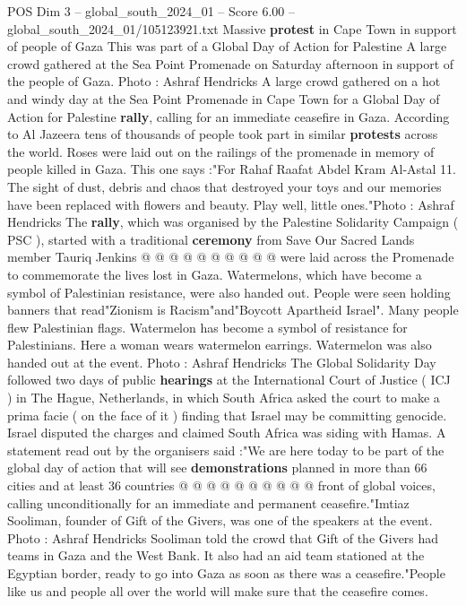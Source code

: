 \begin{textsample}{POS Dim 3 – global\_south\_2024\_01 – Score 6.00 – global\_south\_2024\_01/105123921.txt}  \label{ex:f3_pos_382}
Massive \textbf{protest} in Cape Town in support of people of Gaza This was part of a Global Day of Action for Palestine A large crowd gathered at the Sea Point Promenade on Saturday afternoon in support of the people of Gaza.
Photo : Ashraf Hendricks A large crowd gathered on a hot and windy day at the Sea Point Promenade in Cape Town for a Global Day of Action for Palestine \textbf{rally}, calling for an immediate ceasefire in Gaza.
According to Al Jazeera tens of thousands of people took part in similar \textbf{protests} across the world.
Roses were laid out on the railings of the promenade in memory of people killed in Gaza.
This one says :"For Rahaf Raafat Abdel Kram Al-Astal 11.
The sight of dust, debris and chaos that destroyed your toys and our memories have been replaced with flowers and beauty.
Play well, little ones."Photo : Ashraf Hendricks The \textbf{rally}, which was organised by the Palestine Solidarity Campaign ( PSC ), started with a traditional \textbf{ceremony} from Save Our Sacred Lands member Tauriq Jenkins @ @ @ @ @ @ @ @ @ @ were laid across the Promenade to commemorate the lives lost in Gaza.
Watermelons, which have become a symbol of Palestinian resistance, were also handed out.
People were seen holding banners that read"Zionism is Racism"and"Boycott Apartheid Israel".
Many people flew Palestinian flags.
Watermelon has become a symbol of resistance for Palestinians.
Here a woman wears watermelon earrings.
Watermelon was also handed out at the event.
Photo : Ashraf Hendricks The Global Solidarity Day followed two days of public \textbf{hearings} at the International Court of Justice ( ICJ ) in The Hague, Netherlands, in which South Africa asked the court to make a prima facie ( on the face of it ) finding that Israel may be committing genocide.
Israel disputed the charges and claimed South Africa was siding with Hamas.
A statement read out by the organisers said :"We are here today to be part of the global day of action that will see \textbf{demonstrations} planned in more than 66 cities and at least 36 countries @ @ @ @ @ @ @ @ @ @ front of global voices, calling unconditionally for an immediate and permanent ceasefire."Imtiaz Sooliman, founder of Gift of the Givers, was one of the speakers at the event.
Photo : Ashraf Hendricks Sooliman told the crowd that Gift of the Givers had teams in Gaza and the West Bank.
It also had an aid team stationed at the Egyptian border, ready to go into Gaza as soon as there was a ceasefire."People like us and people all over the world will make sure that the ceasefire comes.

\end{textsample}
